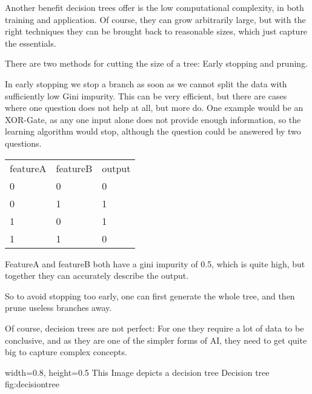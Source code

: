Another benefit decision trees offer is the low computational complexity, in both training and application. Of course, they can grow arbitrarily large, but with the right techniques they can be brought back to reasonable sizes, which just capture the essentials.



There are two methods for cutting the size of a tree: Early stopping and pruning. 

In early stopping we stop a branch as soon as we cannot split the data with sufficiently low Gini impurity. This can be very efficient, but there are cases where one question does not help at all, but more do. One example would be an XOR-Gate, as any one input alone does not provide enough information, so the learning algorithm would stop, although the question could be answered by two questions.

\begin{tabular}{p{} p{} p{}}
    featureA & featureB & output\\
    0 & 0 & 0 \\
    0 & 1 & 1 \\
    1 & 0 & 1 \\
    1 & 1 & 0 \\
\end{tabular}

FeatureA and featureB both have a gini impurity of 0.5, which is quite high, but together they can accurately describe the output.

So to avoid stopping too early, one can first generate the whole tree, and then prune useless branches away.

Of course, decision trees are not perfect: For one they require a lot of data to be conclusive, and as they are one of the simpler forms of AI, they need to get quite big to capture complex concepts.



    {width=0.8\textwidth, height=0.5\textheight} %
    {This Image depicts a decision tree}   %
    {Decision tree}   %
    {fig:decisiontree}    %

 